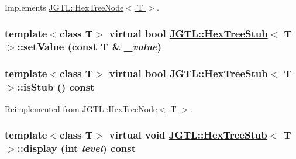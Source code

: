 Implements \hyperlink{class_j_g_t_l_1_1_hex_tree_node_a65570f2ecf17f3537a8a726795b4152}{JGTL::Hex\-Tree\-Node$<$ T $>$}.\hypertarget{class_j_g_t_l_1_1_hex_tree_stub_584fb62fed5dc1c98241660e81e4b875}{
\subsubsection[setValue]{\setlength{\rightskip}{0pt plus 5cm}template$<$class T$>$ virtual bool \hyperlink{class_j_g_t_l_1_1_hex_tree_stub}{JGTL::Hex\-Tree\-Stub}$<$ T $>$::set\-Value (const T \& {\em \_\-value})}}
\label{class_j_g_t_l_1_1_hex_tree_stub_584fb62fed5dc1c98241660e81e4b875}


\hypertarget{class_j_g_t_l_1_1_hex_tree_stub_f2ed502b7b1c2090642589b8ce1d637f}{
\subsubsection[isStub]{\setlength{\rightskip}{0pt plus 5cm}template$<$class T$>$ virtual bool \hyperlink{class_j_g_t_l_1_1_hex_tree_stub}{JGTL::Hex\-Tree\-Stub}$<$ T $>$::is\-Stub () const}}
\label{class_j_g_t_l_1_1_hex_tree_stub_f2ed502b7b1c2090642589b8ce1d637f}




Reimplemented from \hyperlink{class_j_g_t_l_1_1_hex_tree_node_4d37c24c8c3830953d2a9f195d7d26b5}{JGTL::Hex\-Tree\-Node$<$ T $>$}.\hypertarget{class_j_g_t_l_1_1_hex_tree_stub_aa4a8e4efcf4afe347e9e0bf7d5d32ba}{
\subsubsection[display]{\setlength{\rightskip}{0pt plus 5cm}template$<$class T$>$ virtual void \hyperlink{class_j_g_t_l_1_1_hex_tree_stub}{JGTL::Hex\-Tree\-Stub}$<$ T $>$::display (int {\em level}) const}}
\label{class_j_g_t_l_1_1_hex_tree_stub_aa4a8e4efcf4afe347e9e0bf7d5d32ba}




